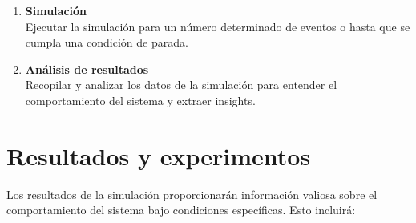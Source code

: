 \documentclass[article]{amsart}
\begin{document}
\begin{enumerate}
\begin{itemize}
\item simulation: se encarga de realizar la simulaci\'on, recibe como par\'ametros las distribuciones que siguen los servidores y el tiempo entre la aparici\'on de clientes. Para esto utiliza la siguiente l\'ogica: se agregan todos los clientes de uno en uno, al momento de agregarlos primero se genera el tiempo que demora en aparecer el cliente, y se actualiza el curent time de la simulaci\'on, luego se ejecutan todos los servicios posibles hasta ese momento, es decir, todos los servidores que estuviesen ocupados en alg\'un servicio cuyo tiempo de finalizacion fuese menor que el momento actual se eliminan del heap de los servidores ocupados y se agregan al heap de los servidores activos, a la vez si hab\'ian clientes en la cola se van procesando al momento en que se vac\'ia alg\'un servidor, finalmente cuando ya no hay m\'as servidores que terminen antes del momento actual se procesa el nuevo cliente, es decir, se escoge el servidor con menor \'indice que se encuentre desocupado, se elimina de los servidores activos, se genera un tiempo aleatorio que se demorar\'a en realizar el servicio y se agrega a los servidores ocupados con un tiempo de finalizaci\'on igual al momento actual m\'as el tiempo generado, de no haber servidores activos se agrega el cliente a la cola. En todo momento se agrega la acci\'on que se est\'a realizando al $simulation.report$. Finalmente se procesan todos los clientes que no han teminado de ejecutar sus respectivos servicios o est\'an en cola, se imprimen los resultados y se reinicia elestado de la simulaci\'on.\\
\end{itemize}
\item \textbf{Simulaci\'on}\\
Ejecutar la simulación para un número determinado de eventos o hasta que se cumpla una condición de parada.\\
\item \textbf{Análisis de resultados}\\
Recopilar y analizar los datos de la simulación para entender el comportamiento del sistema y extraer insights.\\
\end{enumerate}

\newpage
\section{Resultados y experimentos}

Los resultados de la simulación proporcionarán información valiosa sobre el comportamiento del sistema bajo condiciones específicas. Esto incluirá:
\end{document}
